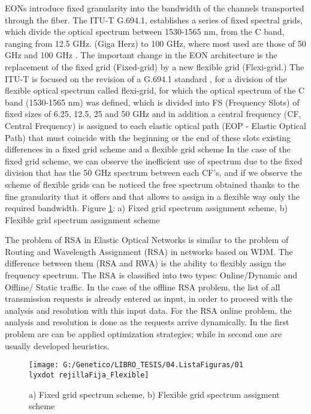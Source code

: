 EONs introduce fixed granularity into the bandwidth of the channels
transported through the fiber. The ITU-T G.694.1, establishes a series
of fixed spectral grids, which divide the optical spectrum between
1530-1565 nm, from the C band, ranging from 12.5 GHz. (Giga Herz)
to 100 GHz, where most used are those of 50 GHz and 100 GHz \cite{itu-t-694-1}.
The important change in the EON architecture is the replacement of
the fixed grid (Fixed-grid) by a new flexible grid (Flexi-grid.) The
ITU-T is focused on the revision of a G.694.1 standard \cite{itu-t-694-1},
for a division of the flexible optical spectrum called flexi-grid,
for which the optical spectrum of the C band (1530-1565 nm) was defined,
which is divided into FS (Frequency Slots) of fixed sizes of 6.25,
12.5, 25 and 50 GHz \cite{itut-flexigrid} and in addition a central
frequency (CF, Central Frequency) is assigned to each elastic optical
path (EOP - Elastic Optical Path) that must coincide with the beginning
or the end of these slots existing differences in a fixed grid scheme
and a flexible grid scheme In the case of the fixed grid scheme, we
can observe the inefficient use of spectrum due to the fixed division
that has the 50 GHz spectrum between each CF's, and if we observe
the scheme of flexible grids can be noticed the free spectrum obtained
thanks to the fine granularity that it offers and that allows to assign
in a flexible way only the required bandwidth. Figure \ref{fixed_grid_flex_grid_figure}:
a) Fixed grid spectrum assignment scheme, b) Flexible grid spectrum
assignment scheme

The problem of RSA in Elastic Optical Networks is similar to the problem
of Routing and Wavelength Assignment (RSA) in networks based on WDM.
The difference between them (RSA and RWA) is the ability to flexibly
assign the frequency spectrum. The RSA is classified into two types:
Online/Dynamic and Offline/ Static traffic. In the case of the offline
RSA problem, the list of all transmission requests is already entered
as input, in order to proceed with the analysis and resolution with
this input data. For the RSA online problem, the analysis and resolution
is done as the requests arrive dynamically. In the first problem are
can be applied optimization strategies; while in second one are usually
developed heuristics. 

\begin{figure}
\texttt{[image: G:/Genetico/LIBRO\_TESIS/04.ListaFiguras/01\\lyxdot rejillaFija\_Flexible]}

\caption{a) Fixed grid spectrum scheme, b) Flexible grid spectrum assigment
scheme}
\label{fixed_grid_flex_grid_figure}
\end{figure}


